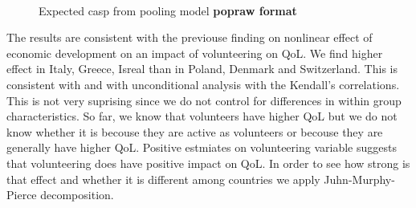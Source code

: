\documentclass[10pt, letterpaper]{article}
\begin{document}
\begin{spacing}{1.4}
\begin{figure}[H]
\centering
\caption{Expected casp from pooling model \textbf{popraw format}} 
\label{fig:pooling1}
\begin{minipage}{1\linewidth}
\quad
{}~\\

\end{minipage}
\end{figure}

   


The results are consistent with the previouse finding on nonlinear effect of economic development on an impact of volunteering on QoL. We find higher effect in Italy, Greece, Isreal than in Poland, Denmark and Switzerland. This  is consistent with \citet{haski09} and with unconditional analysis with the Kendall's correlations. This is not very suprising since we do not control for differences in within group characteristics. So far, we know that volunteers have higher QoL but we do not know whether it is becouse they are active as volunteers or becouse they are generally have higher QoL. Positive estmiates on volunteering variable suggests that volunteering does have positive impact on QoL. In order to see how strong is that effect and whether it is different among countries we apply Juhn-Murphy-Pierce decomposition. 


\end{spacing}
\end{document}

